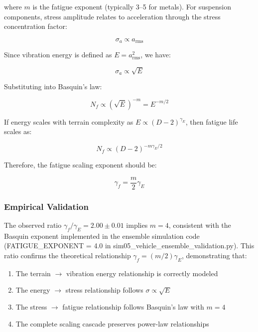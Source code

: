 \documentclass[11pt,letterpaper]{article}
\begin{document}
where $m$ is the fatigue exponent (typically 3--5 for metals). For suspension components, stress amplitude relates to acceleration through the stress concentration factor:

\begin{equation}
\sigma_a \propto a_{\text{rms}}
\end{equation}

Since vibration energy is defined as $E = a_{\text{rms}}^2$, we have:

\begin{equation}
\sigma_a \propto \sqrt{E}
\end{equation}

Substituting into Basquin's law:

\begin{equation}
N_f \propto (\sqrt{E})^{-m} = E^{-m/2}
\end{equation}

If energy scales with terrain complexity as $E \propto (D-2)^{\gamma_E}$, then fatigue life scales as:

\begin{equation}
N_f \propto (D-2)^{-m\gamma_E/2}
\end{equation}

Therefore, the fatigue scaling exponent should be:

\begin{equation}
\gamma_f = \frac{m}{2} \gamma_E
\end{equation}

\subsubsection{Empirical Validation}

The observed ratio $\gamma_f / \gamma_E = 2.00 \pm 0.01$ implies $m = 4$, consistent with the Basquin exponent implemented in the ensemble simulation code (FATIGUE\_EXPONENT = 4.0 in sim05\_vehicle\_ensemble\_validation.py). This ratio confirms the theoretical relationship $\gamma_f = (m/2)\gamma_E$, demonstrating that:

\begin{enumerate}
\item The terrain $\rightarrow$ vibration energy relationship is correctly modeled
\item The energy $\rightarrow$ stress relationship follows $\sigma \propto \sqrt{E}$
\item The stress $\rightarrow$ fatigue relationship follows Basquin's law with $m = 4$
\item The complete scaling cascade preserves power-law relationships
\end{enumerate}
\end{document}
